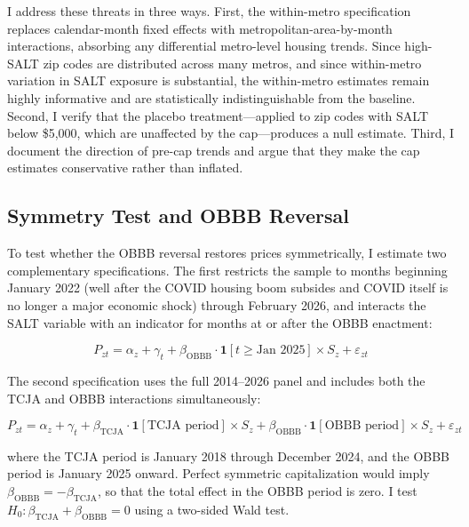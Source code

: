\documentclass[12pt]{article}
\begin{document}
I address these threats in three ways. First, the within-metro specification replaces calendar-month fixed effects with metropolitan-area-by-month interactions, absorbing any differential metro-level housing trends. Since high-SALT zip codes are distributed across many metros, and since within-metro variation in SALT exposure is substantial, the within-metro estimates remain highly informative and are statistically indistinguishable from the baseline. Second, I verify that the placebo treatment---applied to zip codes with SALT below \$5,000, which are unaffected by the cap---produces a null estimate. Third, I document the direction of pre-cap trends and argue that they make the cap estimates conservative rather than inflated.

\subsection{Symmetry Test and OBBB Reversal}

To test whether the OBBB reversal restores prices symmetrically, I estimate two complementary specifications. The first restricts the sample to months beginning January 2022 (well after the COVID housing boom subsides and COVID itself is no longer a major economic shock) through February 2026, and interacts the SALT variable with an indicator for months at or after the OBBB enactment:

\begin{equation}
P_{zt} = \alpha_z + \gamma_t + \beta_{\text{OBBB}} \cdot \mathbf{1}[t \geq \text{Jan 2025}] \times S_z + \varepsilon_{zt}
\label{eq:reversal}
\end{equation}

The second specification uses the full 2014--2026 panel and includes both the TCJA and OBBB interactions simultaneously:

\begin{equation}
P_{zt} = \alpha_z + \gamma_t + \beta_{\text{TCJA}} \cdot \mathbf{1}[\text{TCJA period}] \times S_z + \beta_{\text{OBBB}} \cdot \mathbf{1}[\text{OBBB period}] \times S_z + \varepsilon_{zt}
\label{eq:symmetry}
\end{equation}

where the TCJA period is January 2018 through December 2024, and the OBBB period is January 2025 onward. Perfect symmetric capitalization would imply $\beta_{\text{OBBB}} = -\beta_{\text{TCJA}}$, so that the total effect in the OBBB period is zero. I test $H_0: \beta_{\text{TCJA}} + \beta_{\text{OBBB}} = 0$ using a two-sided Wald test.
\end{document}
